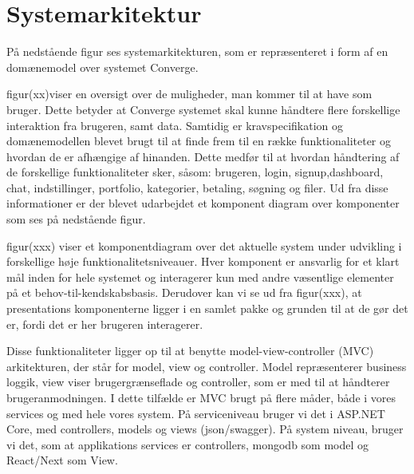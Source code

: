 
\section{Systemarkitektur}
På nedstående figur ses systemarkitekturen, som er repræsenteret i form af en domænemodel over systemet Converge.


figur(xx)viser en oversigt over de muligheder, man kommer til at have som bruger. Dette betyder at Converge systemet
skal kunne håndtere flere forskellige interaktion fra brugeren, samt data. Samtidig er kravspecifikation og domænemodellen
blevet brugt til at finde frem til en række funktionaliteter og hvordan de er afhængige af hinanden. Dette
medfør til at hvordan håndtering af de forskellige funktionaliteter sker, såsom: brugeren, login, signup,dashboard,
chat, indstillinger, portfolio, kategorier, betaling, søgning og filer. Ud fra disse informationer er der blevet udarbejdet
et komponent diagram over komponenter som ses på nedstående figur.


figur(xxx) viser et komponentdiagram over det aktuelle system under udvikling i forskellige høje funktionalitetsniveauer.
Hver komponent er ansvarlig for et klart mål inden for hele systemet og interagerer kun med andre væsentlige
elementer på et behov-til-kendskabsbasis. Derudover kan vi se ud fra figur(xxx), at presentations komponenterne
ligger i en samlet pakke og grunden til at de gør det er, fordi det er her brugeren interagerer.

Disse funktionaliteter ligger op til at benytte model-view-controller (MVC) arkitekturen, der står for model, view og
controller. Model repræsenterer business loggik, view viser brugergrænseflade og controller, som er med til at håndterer
brugeranmodningen. I dette tilfælde er MVC brugt på flere måder, både i vores services og med hele vores
system. På serviceniveau bruger vi det i ASP.NET Core, med controllers, models og views (json/swagger). På system
niveau, bruger vi det, som at applikations services er controllers, mongodb som model og React/Next som
View.




